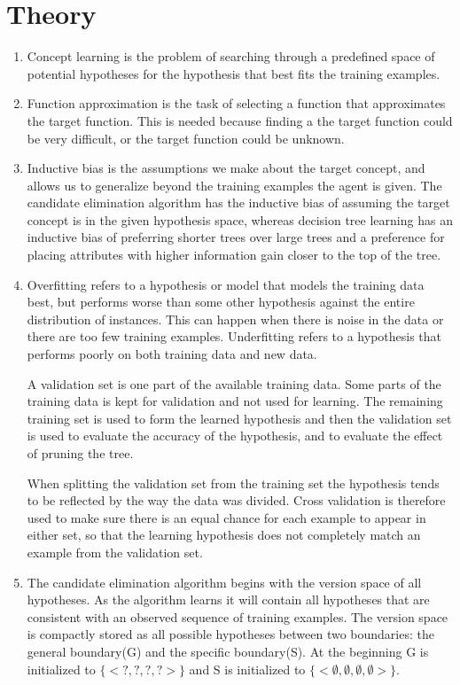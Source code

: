 \documentclass[a4paper]{article}
\date{}
\begin{document}
\thispagestyle{fancy}

\section{Theory}
\begin{enumerate}
    \item
        Concept learning is the problem of searching through a predefined space
        of potential hypotheses for the hypothesis that best fits the training
        examples.
    \item
        Function approximation is the task of selecting a function that
        approximates the target function. This is needed because finding a the
        target function could be very difficult, or the target function could
        be unknown.
    \item
        Inductive bias is the assumptions we make about the target concept, and
        allows us to generalize beyond the training examples the agent is
        given. The candidate elimination algorithm has the inductive bias of
        assuming the target concept is in the given hypothesis space, whereas
        decision tree learning has an inductive bias of preferring shorter trees
        over large trees and a preference for placing attributes with higher
        information gain closer to the top of the tree.
    \item
        Overfitting refers to a hypothesis or model that models the training
        data best, but performs worse than some other hypothesis against the
        entire distribution of instances. This can happen when there is noise
        in the data or there are too few training examples. Underfitting refers
        to a hypothesis that performs poorly on both training data and new
        data.

        A validation set is one part of the available training data. Some parts
        of the training data is kept for validation and not used for learning.
        The remaining training set is used to form the learned hypothesis and
        then the validation set is used to evaluate the accuracy of the
        hypothesis, and to evaluate the effect of pruning the tree.

        When splitting the validation set from the training set the hypothesis
        tends to be reflected by the way the data was divided. Cross validation
        is therefore used to make sure there is an equal chance for each
        example to appear in either set, so that the learning hypothesis does
        not completely match an example from the validation set.
    \item
        The candidate elimination algorithm begins with the version space of
        all hypotheses. As the algorithm learns it will contain all hypotheses
        that are consistent with an observed sequence of training examples. The
        version space is compactly stored as all possible hypotheses between
        two boundaries: the general boundary(G) and the specific boundary(S).
        At the beginning G is initialized to $\{<?,?,?,?>\}$ and S is
        initialized to $\{<\emptyset,\emptyset,\emptyset,\emptyset>\}$.


\end{enumerate}
\end{document}
